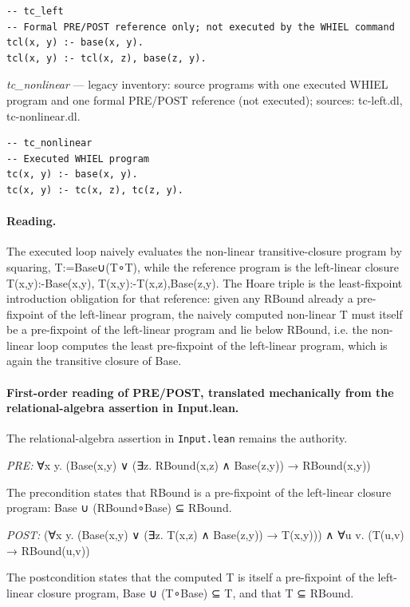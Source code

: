 \documentclass[10pt]{article}
\begin{document}
\begin{Verbatim}[fontsize=\scriptsize,breaklines=true,breakanywhere=true,frame=single,framesep=1.5mm]
-- tc_left
-- Formal PRE/POST reference only; not executed by the WHIEL command
tcl(x, y) :- base(x, y).
tcl(x, y) :- tcl(x, z), base(z, y).
\end{Verbatim}

{\raggedright\textit{tc\_nonlinear} --- legacy inventory: source programs with one executed WHIEL program and one formal PRE/POST reference (not executed); sources: tc-left.dl, tc-nonlinear.dl.\par}

\begin{Verbatim}[fontsize=\scriptsize,breaklines=true,breakanywhere=true,frame=single,framesep=1.5mm]
-- tc_nonlinear
-- Executed WHIEL program
tc(x, y) :- base(x, y).
tc(x, y) :- tc(x, z), tc(z, y).
\end{Verbatim}

\paragraph{Reading.} The executed loop naively evaluates the non-linear transitive-closure program by squaring, T:=Base∪(T∘T), while the reference program is the left-linear closure T(x,y):-Base(x,y), T(x,y):-T(x,z),Base(z,y). The Hoare triple is the least-fixpoint introduction obligation for that reference: given any RBound already a pre-fixpoint of the left-linear program, the naively computed non-linear T must itself be a pre-fixpoint of the left-linear program and lie below RBound, i.e. the non-linear loop computes the least pre-fixpoint of the left-linear program, which is again the transitive closure of Base.

\paragraph{First-order reading of PRE/POST, translated mechanically from the relational-algebra assertion in Input.lean.} The relational-algebra assertion in \texttt{Input.lean} remains the authority.

\textit{PRE:} ∀x y. (Base(x,y) ∨ (∃z. RBound(x,z) ∧ Base(z,y)) → RBound(x,y))\par The precondition states that RBound is a pre-fixpoint of the left-linear closure program: Base ∪ (RBound∘Base) ⊆ RBound.

\textit{POST:} (∀x y. (Base(x,y) ∨ (∃z. T(x,z) ∧ Base(z,y)) → T(x,y))) ∧ ∀u v. (T(u,v) → RBound(u,v))\par The postcondition states that the computed T is itself a pre-fixpoint of the left-linear closure program, Base ∪ (T∘Base) ⊆ T, and that T ⊆ RBound.
\end{document}
